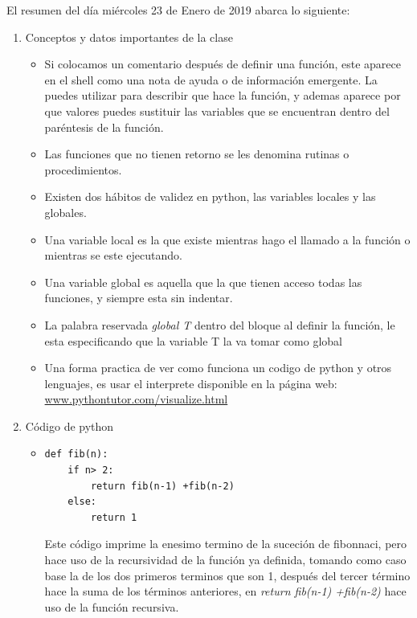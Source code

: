 \documentclass[letterpaper, 12pt,oneside]{article}
\begin{document}
	El resumen del día miércoles 23 de Enero de 2019 abarca lo siguiente:
	\begin{enumerate}
		\item Conceptos y datos importantes de la clase
			\begin{itemize}
				\item Si colocamos un comentario después de definir una función, este aparece en el shell como una nota de ayuda o de información emergente. La puedes utilizar para describir que hace la función, y ademas aparece por que valores puedes sustituir las variables que se encuentran dentro del paréntesis de la función.
				\item Las funciones que no tienen retorno se les denomina rutinas o procedimientos.
				\item Existen dos hábitos de validez en python, las variables locales y las globales.
				\item Una variable local es la que existe mientras hago el llamado a la función o mientras se este ejecutando.
				\item Una variable global es aquella que la que tienen acceso todas las funciones, y siempre esta sin indentar.
				\item La palabra reservada \textit{global T} dentro del bloque al definir la función, le esta especificando que la variable T la va tomar como global
				\item Una forma practica de ver como funciona un codigo de python y otros lenguajes, es usar el interprete disponible en la página web: \url{www.pythontutor.com/visualize.html}
				
			\end{itemize}
		
		
		
		\item Código de python
			\begin{itemize}
				\item \begin{lstlisting}
def fib(n):
    if n> 2:
        return fib(n-1) +fib(n-2)
    else:
        return 1
				\end{lstlisting} Este código imprime la enesimo termino de la suceción de fibonnaci, pero hace uso de la recursividad de la función ya definida, tomando como caso base la de los dos primeros terminos que son 1, después del tercer término hace la suma de los términos anteriores, en \textit{return fib(n-1) +fib(n-2)} hace uso de la función recursiva.\\
				

\end{itemize}
\end{enumerate}
\end{document}
